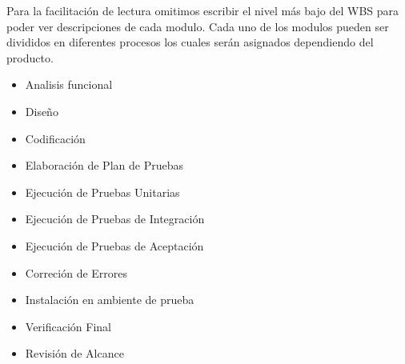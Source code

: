 Para la facilitación de lectura omitimos escribir el nivel más bajo del WBS para poder ver descripciones de cada modulo. Cada uno de los modulos pueden ser divididos en diferentes procesos
los cuales serán asignados dependiendo del producto.
\begin{itemize}
 \item Analisis funcional
 \item Diseño
 \item Codificación
 \item Elaboración de Plan de Pruebas
 \item Ejecución de Pruebas Unitarias
 \item Ejecución de Pruebas de Integración
 \item Ejecución de Pruebas de Aceptación
 \item Correción de Errores
 \item Instalación en ambiente de prueba
 \item Verificación Final
 \item Revisión de Alcance
\end{itemize}	
